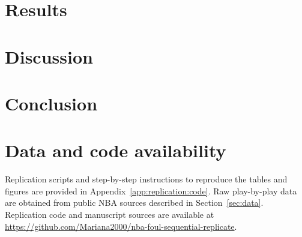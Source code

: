 \documentclass[11pt]{article}
\begin{document}
\section{Results}


\section{Discussion}


\section{Conclusion}


\section*{Data and code availability}
\label{app:replication}
Replication scripts and step-by-step instructions to reproduce the tables and figures are provided in Appendix~\ref{app:replication:code}. Raw play-by-play data are obtained from public NBA sources described in Section~\ref{sec:data}. Replication code and manuscript sources are available at \url{https://github.com/Mariana2000/nba-foul-sequential-replicate}.




\appendix





\end{document}
